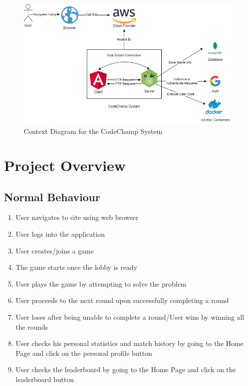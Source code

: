 \documentclass[12pt, titlepage]{article}
\begin{document}
\begin{figure}[H]
\centering
\includegraphics[scale=0.65]{Design/SystDesign/SystemBoundary.png}
\caption{Context Diagram for the CodeChamp System}
\end{figure}

\section{Project Overview}

\subsection{Normal Behaviour}

\begin{enumerate}
    \item User navigates to site using web browser
    \item User logs into the application
    \item User creates/joins a game
    \item The game starts once the lobby is ready
    \item User plays the game by attempting to solve the problem
    \item User proceeds to the next round upon successfully completing a round
    \item User loses after being unable to complete a round/User wins by winning all the rounds
    \item User checks his personal statistics and match history by going to the Home Page and click on the personal profile button
    \item User checks the leaderboard by going to the Home Page and click on the leaderboard button
\end{enumerate}
\end{document}
